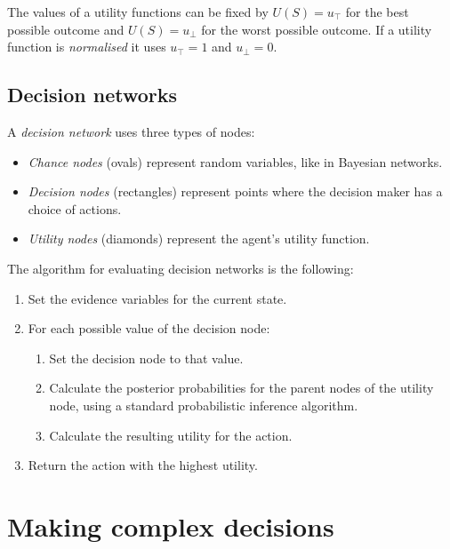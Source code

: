 \documentclass{article}
\begin{document}
\begin{definition}
    The values of a utility functions can be fixed by $U(S)=u_\top$ for the
    best possible outcome and $U(S)=u_\bot$ for the worst possible outcome.
    If a utility function is \emph{normalised} it uses $u_\top = 1$ and
    $u_\bot = 0$.
\end{definition}

\subsection{Decision networks}

\begin{definition}
    A \emph{decision network} uses three types of nodes:
    \begin{itemize}
        \item \emph{Chance nodes} (ovals) represent random variables, like in Bayesian networks.
        \item \emph{Decision nodes} (rectangles) represent points where the decision maker
        has a choice of actions. 
        \item \emph{Utility nodes} (diamonds) represent the agent's utility function.
    \end{itemize}
\end{definition}

\begin{theorem}
    The algorithm for evaluating decision networks is the following:
    \begin{enumerate}
        \item Set the evidence variables for the current state.
        \item For each possible value of the decision node: \begin{enumerate}
            \item Set the decision node to that value.
            \item Calculate the posterior probabilities for the parent nodes of
            the utility node, using a standard probabilistic inference algorithm.
            \item Calculate the resulting utility for the action.
        \end{enumerate}
        \item Return the action with the highest utility.
    \end{enumerate}
\end{theorem}


\section{Making complex decisions}
\end{document}
